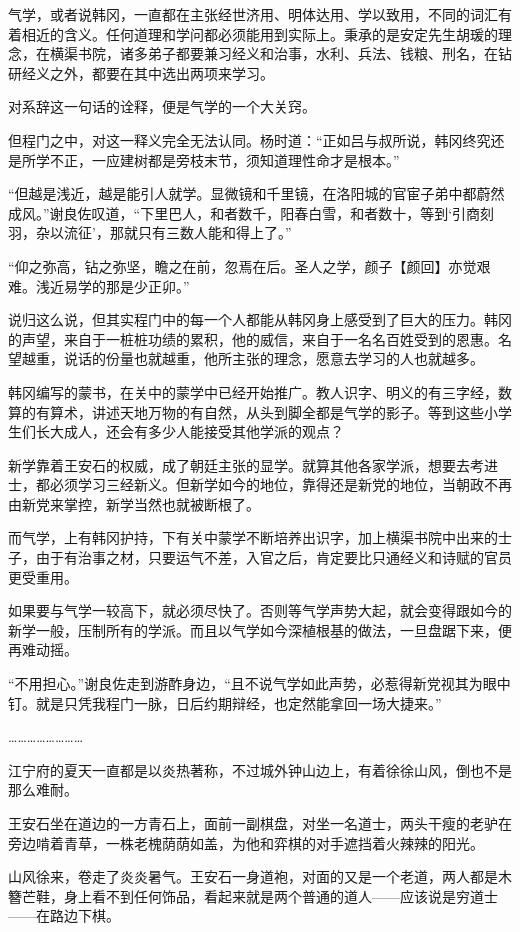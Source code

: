 气学，或者说韩冈，一直都在主张经世济用、明体达用、学以致用，不同的词汇有着相近的含义。任何道理和学问都必须能用到实际上。秉承的是安定先生胡瑗的理念，在横渠书院，诸多弟子都要兼习经义和治事，水利、兵法、钱粮、刑名，在钻研经义之外，都要在其中选出两项来学习。

对系辞这一句话的诠释，便是气学的一个大关窍。

但程门之中，对这一释义完全无法认同。杨时道：“正如吕与叔所说，韩冈终究还是所学不正，一应建树都是旁枝末节，须知道理性命才是根本。”

“但越是浅近，越是能引人就学。显微镜和千里镜，在洛阳城的官宦子弟中都蔚然成风。”谢良佐叹道，“下里巴人，和者数千，阳春白雪，和者数十，等到‘引商刻羽，杂以流征’，那就只有三数人能和得上了。”

“仰之弥高，钻之弥坚，瞻之在前，忽焉在后。圣人之学，颜子【颜回】亦觉艰难。浅近易学的那是少正卯。”

说归这么说，但其实程门中的每一个人都能从韩冈身上感受到了巨大的压力。韩冈的声望，来自于一桩桩功绩的累积，他的威信，来自于一名名百姓受到的恩惠。名望越重，说话的份量也就越重，他所主张的理念，愿意去学习的人也就越多。

韩冈编写的蒙书，在关中的蒙学中已经开始推广。教人识字、明义的有三字经，数算的有算术，讲述天地万物的有自然，从头到脚全都是气学的影子。等到这些小学生们长大成人，还会有多少人能接受其他学派的观点？

新学靠着王安石的权威，成了朝廷主张的显学。就算其他各家学派，想要去考进士，都必须学习三经新义。但新学如今的地位，靠得还是新党的地位，当朝政不再由新党来掌控，新学当然也就被断根了。

而气学，上有韩冈护持，下有关中蒙学不断培养出识字，加上横渠书院中出来的士子，由于有治事之材，只要运气不差，入官之后，肯定要比只通经义和诗赋的官员更受重用。

如果要与气学一较高下，就必须尽快了。否则等气学声势大起，就会变得跟如今的新学一般，压制所有的学派。而且以气学如今深植根基的做法，一旦盘踞下来，便再难动摇。

“不用担心。”谢良佐走到游酢身边，“且不说气学如此声势，必惹得新党视其为眼中钉。就是只凭我程门一脉，日后约期辩经，也定然能拿回一场大捷来。”

……………………

江宁府的夏天一直都是以炎热著称，不过城外钟山边上，有着徐徐山风，倒也不是那么难耐。

王安石坐在道边的一方青石上，面前一副棋盘，对坐一名道士，两头干瘦的老驴在旁边啃着青草，一株老槐荫荫如盖，为他和弈棋的对手遮挡着火辣辣的阳光。

山风徐来，卷走了炎炎暑气。王安石一身道袍，对面的又是一个老道，两人都是木簪芒鞋，身上看不到任何饰品，看起来就是两个普通的道人——应该说是穷道士——在路边下棋。

